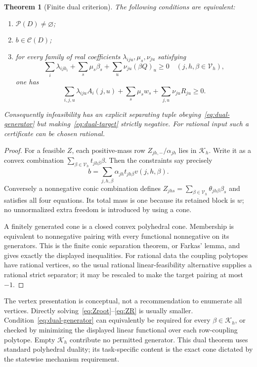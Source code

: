 \documentclass[11pt]{article}
\newcommand{\Pcal}{\mathcal P}
\newcommand{\Kcal}{\mathcal K}
\newcommand{\Ccal}{\mathcal C}
\newtheorem{theorem}{Theorem}[section]
\theoremstyle{remark}
\begin{document}
\begin{theorem}[Finite dual criterion]\label{thm:dual}
The following conditions are equivalent:
\begin{enumerate}
\item $\Pcal(D)\ne\varnothing$;
\item $b\in\Ccal(D)$;
\item for every family of real coefficients $\lambda_{iju},\mu_s,\nu_{ju}$ satisfying
\begin{equation}\label{eq:dual-generator}
 \sum_i\lambda_{ijh_i}
 +\sum_s\mu_s\beta_s
 +\sum_u\nu_{ju}(\beta Q)_u\ge0
 \quad(j,h,\beta\in\mathcal V_h),
\end{equation}
one has
\begin{equation}\label{eq:dual-target}
 \sum_{i,j,u}\lambda_{iju}A_i(j,u)
 +\sum_s\mu_sw_s
 +\sum_{j,u}\nu_{ju}R_{ju}\ge0.
\end{equation}
\end{enumerate}
Consequently infeasibility has an explicit separating tuple obeying~\eqref{eq:dual-generator} but making~\eqref{eq:dual-target} strictly negative. For rational input such a certificate can be chosen rational.
\end{theorem}
\begin{proof}
For a feasible $Z$, each positive-mass row $Z_{jh,-}/\alpha_{jh}$ lies in $\Kcal_h$. Write it as a convex combination $\sum_{\beta\in\mathcal V_h}t_{jh\beta}\beta$. Then the constraints say precisely
\[
 b=\sum_{j,h,\beta}\alpha_{jh}t_{jh\beta}v(j,h,\beta).
\]
Conversely a nonnegative conic combination defines
$Z_{jhs}=\sum_{\beta\in\mathcal V_h}\theta_{jh\beta}\beta_s$ and satisfies all four equations. Its total mass is one because its retained block is $w$; no unnormalized extra freedom is introduced by using a cone.

A finitely generated cone is a closed convex polyhedral cone. Membership is equivalent to nonnegative pairing with every functional nonnegative on its generators. This is the finite conic separation theorem, or Farkas' lemma, and gives exactly the displayed inequalities. For rational data the coupling polytopes have rational vertices, so the usual rational linear-feasibility alternative supplies a rational strict separator; it may be rescaled to make the target pairing at most $-1$.
\end{proof}

The vertex presentation is conceptual, not a recommendation to enumerate all vertices. Directly solving~\eqref{eq:Zroot}--\eqref{eq:ZR} is usually smaller. Condition~\eqref{eq:dual-generator} can equivalently be required for every $\beta\in\Kcal_h$, or checked by minimizing the displayed linear functional over each row-coupling polytope. Empty $\Kcal_h$ contribute no permitted generator. This dual theorem uses standard polyhedral duality; its task-specific content is the exact cone dictated by the statewise mechanism requirement.
\end{document}
